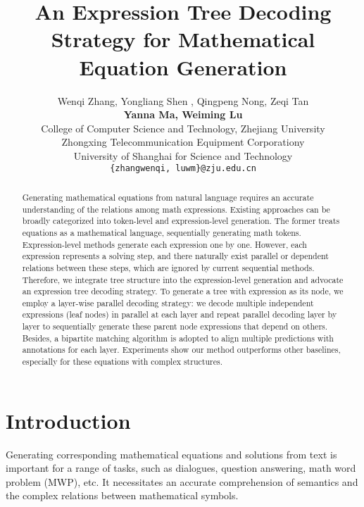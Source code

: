 \documentclass[11pt]{article}
\title{An Expression Tree Decoding Strategy for Mathematical Equation Generation}
\author{Wenqi Zhang, Yongliang Shen , Qingpeng Nong, Zeqi Tan\\
  {\bf Yanna Ma, \bf Weiming Lu}\\
  College of Computer Science and Technology, Zhejiang University \\
  Zhongxing Telecommunication Equipment Corporationy\\
  University of Shanghai for Science and Technology\\
  \texttt{\{zhangwenqi, luwm\}@zju.edu.cn} }
\begin{document}
\maketitle
\renewcommand{\thefootnote}{\fnsymbol{footnote}}   \renewcommand{\thefootnote}{\arabic{footnote}}

\begin{abstract}



Generating mathematical equations from natural language requires an accurate understanding of the relations among math expressions. Existing approaches can be broadly categorized into token-level and expression-level generation. The former treats equations as a mathematical language, sequentially generating math tokens. Expression-level methods generate each expression one by one. However, each expression represents a solving step, and there naturally exist parallel or dependent relations between these steps, which are ignored by current sequential methods. Therefore, we integrate tree structure into the expression-level generation and advocate an expression tree decoding strategy. To generate a tree with expression as its node, we employ a layer-wise parallel decoding strategy: we decode multiple independent expressions (leaf nodes) in parallel at each layer and repeat parallel decoding layer by layer to sequentially generate these parent node expressions that depend on others. Besides, a bipartite matching algorithm is adopted to align multiple predictions with annotations for each layer. Experiments show our method outperforms other baselines, especially for these equations with complex structures.

























\end{abstract}

\section{Introduction}


Generating corresponding mathematical equations and solutions from text is important for a range of tasks, such as dialogues, question answering, math word problem (MWP), etc. It necessitates an accurate comprehension of semantics and the complex relations between mathematical symbols.
\end{document}
